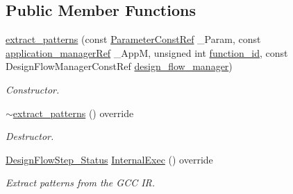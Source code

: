 \subsection*{Public Member Functions}
\begin{DoxyCompactItemize}
\item 
\hyperlink{classextract__patterns_a87135feeaeca7d244b0cdaf91a4a079c}{extract\+\_\+patterns} (const \hyperlink{Parameter_8hpp_a37841774a6fcb479b597fdf8955eb4ea}{Parameter\+Const\+Ref} \+\_\+\+Param, const \hyperlink{application__manager_8hpp_a04ccad4e5ee401e8934306672082c180}{application\+\_\+manager\+Ref} \+\_\+\+AppM, unsigned int \hyperlink{classFunctionFrontendFlowStep_a58ef2383ad1a212a8d3f396625a4b616}{function\+\_\+id}, const Design\+Flow\+Manager\+Const\+Ref \hyperlink{classDesignFlowStep_ab770677ddf087613add30024e16a5554}{design\+\_\+flow\+\_\+manager})
\begin{DoxyCompactList}\small\item\em Constructor. \end{DoxyCompactList}\item 
\hyperlink{classextract__patterns_a5c2193772858461b9749c3d151c7ae5f}{$\sim$extract\+\_\+patterns} () override
\begin{DoxyCompactList}\small\item\em Destructor. \end{DoxyCompactList}\item 
\hyperlink{design__flow__step_8hpp_afb1f0d73069c26076b8d31dbc8ebecdf}{Design\+Flow\+Step\+\_\+\+Status} \hyperlink{classextract__patterns_accaa03e77d1878c22602ff594e1206d3}{Internal\+Exec} () override
\begin{DoxyCompactList}\small\item\em Extract patterns from the G\+CC IR. \end{DoxyCompactList}\end{DoxyCompactItemize}
